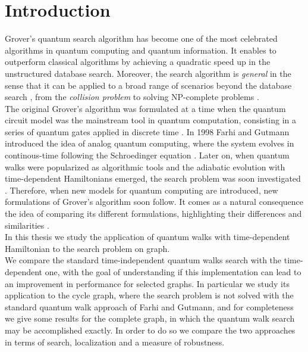 \newpage
\vspace{-4cm}
\chapter*{\textbf{Introduction}}

\vspace{-2cm}
Grover's quantum search algorithm has become one of the most celebrated algorithms in quantum computing and quantum information. It enables to outperform classical algorithms by achieving a quadratic speed up in the unstructured database search. Moreover, the search algorithm is \textit{general} in the sense that it can be applied to a broad range of scenarios beyond the database search \cite{Nielsen2000}, from the \textit{collision problem} \cite{Brassard2015} to solving  NP-complete problems \cite{10.1007/978-3-540-78773-0_67}.\\


The original Grover's algorithm was formulated at a time when the quantum circuit model was the mainstream tool in quantum computation, consisting in a series of quantum gates applied in discrete time \cite{Wong2016}. In 1998 Farhi and Gutmann introduced the idea of analog quantum computing, where the system evolves in continous-time following the Schroedinger equation \cite{Farhi1998}. Later on, when quantum walks were popularized as algorithmic tools and the adiabatic evolution with time-dependent Hamiltonians emerged, the search problem was soon investigated \cite{Childs2004, Farhi2000}. Therefore, when new models for quantum computing are introduced, new formulations of Grover's algorithm soon follow. It comes as a natural consequence the idea of comparing its different formulations, highlighting their differences and similarities \cite{Wong2016}. \\


In this thesis we study the application of quantum walks with time-dependent Hamiltonian to the search problem on graph. \\We compare the standard time-independent quantum walks search with the time-dependent one, with the goal of understanding if this implementation can lead to an improvement in performance for selected graphs. In particular we study its application to the cycle graph, where the search problem is not solved with the standard quantum walk approach of Farhi and Gutmann, and for completeness we give some results for the complete graph, in which the quantum walk search may be accomplished exactly. In order to do so we compare the two approaches in terms of search, localization and a measure of robustness.\\ \\

